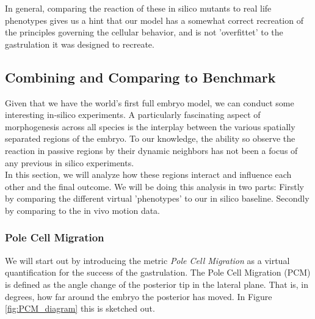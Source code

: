 In general, comparing the reaction of these in silico mutants to real life phenotypes gives us a hint that our model has a somewhat correct recreation of the principles governing the cellular behavior, and is not 'overfittet' to the gastrulation it was designed to recreate.






\subsection{Combining and Comparing to Benchmark}
Given that we have the world’s first full embryo model, we can conduct some interesting in-silico experiments. A particularly fascinating aspect of morphogenesis across all species is the interplay between the various spatially separated regions of the embryo. To our knowledge, the ability so observe the reaction in passive regions by their dynamic neighbors has not been a focus of any previous in silico experiments.\\

In this section, we will analyze how these regions interact and influence each other and the final outcome. We will be doing this analysis in two parts: Firstly by comparing the different virtual 'phenotypes' to our in silico baseline. Secondly by comparing to the in vivo motion data.  

\subsubsection{Pole Cell Migration}
We will start out by introducing the metric \textit{Pole Cell Migration} as a virtual quantification for the success of the gastrulation. The Pole Cell Migration (PCM) is defined as the angle change of the posterior tip in the lateral plane. That is, in degrees, how far around the embryo the posterior has moved. In Figure \ref{fig:PCM_diagram} this is sketched out.  \\


